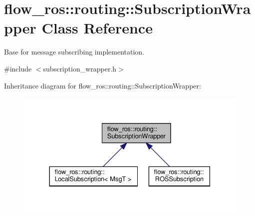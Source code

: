 \hypertarget{classflow__ros_1_1routing_1_1_subscription_wrapper}{}\section{flow\+\_\+ros\+:\+:routing\+:\+:Subscription\+Wrapper Class Reference}
\label{classflow__ros_1_1routing_1_1_subscription_wrapper}


Base for message subscribing implementation.  




{\ttfamily \#include $<$subscription\+\_\+wrapper.\+h$>$}



Inheritance diagram for flow\+\_\+ros\+:\+:routing\+:\+:Subscription\+Wrapper\+:\nopagebreak
\begin{figure}[H]
\begin{center}
\leavevmode
\includegraphics[width=330pt]{classflow__ros_1_1routing_1_1_subscription_wrapper__inherit__graph}
\end{center}
\end{figure}
